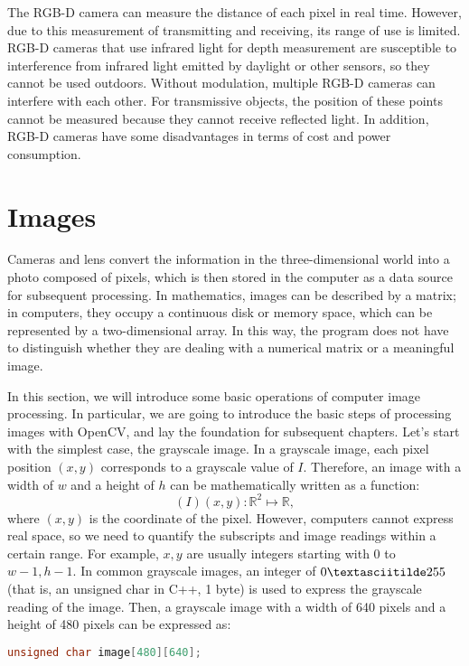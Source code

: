 The RGB-D camera can measure the distance of each pixel in real time. However, due to this measurement of transmitting and receiving, its range of use is limited. RGB-D cameras that use infrared light for depth measurement are susceptible to interference from infrared light emitted by daylight or other sensors, so they cannot be used outdoors. Without modulation, multiple RGB-D cameras can interfere with each other. For transmissive objects, the position of these points cannot be measured because they cannot receive reflected light. In addition, RGB-D cameras have some disadvantages in terms of cost and power consumption.

\section{Images}
Cameras and lens convert the information in the three-dimensional world into a photo composed of pixels, which is then stored in the computer as a data source for subsequent processing. In mathematics, images can be described by a matrix; in computers, they occupy a continuous disk or memory space, which can be represented by a two-dimensional array. In this way, the program does not have to distinguish whether they are dealing with a numerical matrix or a meaningful image.

In this section, we will introduce some basic operations of computer image processing. In particular, we are going to introduce the basic steps of processing images with OpenCV, and lay the foundation for subsequent chapters. Let's start with the simplest case, the grayscale image. In a grayscale image, each pixel position $ (x, y) $ corresponds to a grayscale value of $ I $. Therefore, an image with a width of $ w $ and a height of $ h $ can be mathematically written as a function:
\[
(I) (x, y): \mathbb {R} ^ 2 \mapsto \mathbb {R},
\]
where $ (x, y) $ is the coordinate of the pixel. However, computers cannot express real space, so we need to quantify the subscripts and image readings within a certain range. For example, $ x, y $ are usually integers starting with 0 to $w-1, h-1$. In common grayscale images, an integer of $0 \textasciitilde 255$ (that is, an unsigned char in C++, 1 byte) is used to express the grayscale reading of the image. Then, a grayscale image with a width of 640 pixels and a height of 480 pixels can be expressed as:
\begin{lstlisting}[language=C++, caption=Use 2D array to express an image]
unsigned char image[480][640];
\end{lstlisting}

